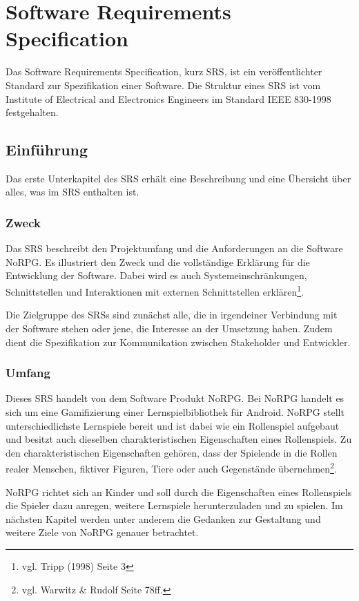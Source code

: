 \chapter{Software Requirements Specification}
	Das Software Requirements Specification, kurz SRS, ist ein veröffentlichter Standard zur Spezifikation einer Software. Die Struktur eines SRS ist vom Institute of Electrical and Electronics Engineers im Standard IEEE 830-1998 festgehalten.
	
\section{Einführung}
	Das erste Unterkapitel des SRS erhält eine Beschreibung und eine Übersicht über alles, was im SRS enthalten ist.
	
	\subsection{Zweck}	
		Das SRS beschreibt den Projektumfang und die Anforderungen an die Software NoRPG. Es illustriert den Zweck und die vollständige Erklärung für die Entwicklung der Software. Dabei wird es auch Systemeinschränkungen, Schnittstellen und Interaktionen mit externen Schnittstellen erklären\footnote{vgl. Tripp \cite{srsIEEE}(1998) Seite 3}. 
	
		Die Zielgruppe des SRSs sind zunächst alle, die in irgendeiner Verbindung mit der Software stehen oder jene, die Interesse an der Umsetzung haben. Zudem dient die Spezifikation zur Kommunikation zwischen Stakeholder und Entwickler.
		
	\subsection{Umfang}
		Dieses SRS handelt von dem Software Produkt NoRPG. Bei NoRPG handelt es sich um eine Gamifizierung einer Lernspielbibliothek für Android. NoRPG stellt unterschiedlichste Lernspiele bereit und ist dabei wie ein Rollenspiel aufgebaut und besitzt auch dieselben charakteristischen Eigenschaften eines Rollenspiels. Zu den charakteristischen Eigenschaften gehören, dass der Spielende in die Rollen realer Menschen, fiktiver Figuren, Tiere oder auch Gegenstände übernehmen\footnote{vgl. Warwitz & Rudolf \cite{rpgSinn} Seite 78ff.}.
		
		NoRPG richtet sich an Kinder und soll durch die Eigenschaften eines Rollenspiels die Spieler dazu anregen, weitere Lernspiele herunterzuladen und zu spielen. Im nächsten Kapitel werden unter anderem die Gedanken zur Gestaltung und weitere Ziele von NoRPG genauer betrachtet. %
		
